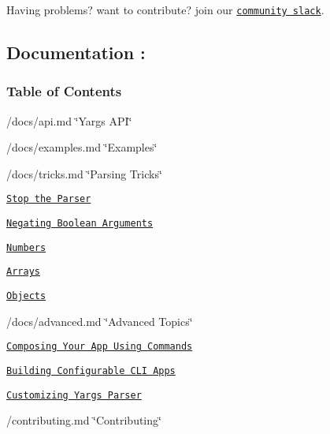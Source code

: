 Having problems? want to contribute? join our \href{http://devtoolscommunity.herokuapp.com}{\tt community slack}.

\subsection*{Documentation \+:}

\subsubsection*{Table of Contents}


\begin{DoxyItemize}
\item /docs/api.md \char`\"{}\+Yargs\textquotesingle{} A\+P\+I\char`\"{}
\item /docs/examples.md \char`\"{}\+Examples\char`\"{}
\item /docs/tricks.md \char`\"{}\+Parsing Tricks\char`\"{}
\begin{DoxyItemize}
\item \href{/docs/tricks.md#stop}{\tt Stop the Parser}
\item \href{/docs/tricks.md#negate}{\tt Negating Boolean Arguments}
\item \href{/docs/tricks.md#numbers}{\tt Numbers}
\item \href{/docs/tricks.md#arrays}{\tt Arrays}
\item \href{/docs/tricks.md#objects}{\tt Objects}
\end{DoxyItemize}
\item /docs/advanced.md \char`\"{}\+Advanced Topics\char`\"{}
\begin{DoxyItemize}
\item \href{/docs/advanced.md#commands}{\tt Composing Your App Using Commands}
\item \href{/docs/advanced.md#configuration}{\tt Building Configurable C\+LI Apps}
\item \href{/docs/advanced.md#customizing}{\tt Customizing Yargs\textquotesingle{} Parser}
\end{DoxyItemize}
\item /contributing.md \char`\"{}\+Contributing\char`\"{} 
\end{DoxyItemize}